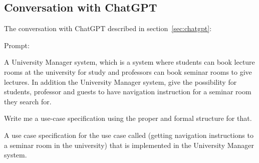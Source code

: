 \documentclass[conference,onecolumn]{IEEEtran}
\begin{document}
\subsection{Conversation with ChatGPT} \label{appdx:chatgpt}
 
The conversation with ChatGPT described in section~\ref{sec:chatgpt}:

Prompt:
\begin{framed}
	\small
	A University Manager system, which is a system where students can book lecture rooms at the university for study and professors can book seminar rooms to give lectures. In addition the University Manager system, give the possibility for students, professor and guests  to have navigation instruction for a seminar room they search for.
	
	Write me a use-case specification using the proper and formal structure for that.
	
	A use case specification for the use case called (getting navigation instructions to a seminar room in the university) that is implemented in the University Manager system.
\end{framed}
\end{document}
